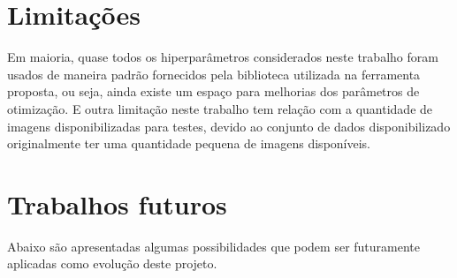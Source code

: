 \documentclass[
	12pt,				%
	oneside,			%
	a4paper,			%
	english,			%
	brazil				%
	]{abntex2ppgsi}
\begin{document}
\section{Limitações}
Em maioria, quase todos os hiperparâmetros considerados neste trabalho foram usados de maneira padrão fornecidos pela biblioteca utilizada na ferramenta proposta, ou seja, ainda existe um espaço para melhorias dos parâmetros de otimização. E outra limitação neste trabalho tem relação com a quantidade de imagens disponibilizadas para testes, devido ao conjunto de dados disponibilizado originalmente ter uma quantidade pequena de imagens disponíveis.

\section{Trabalhos futuros}
Abaixo são apresentadas algumas possibilidades que podem ser futuramente aplicadas como evolução deste projeto.
\end{document}

